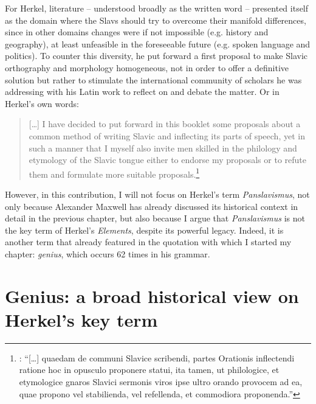 \noindent For Herkel, literature – understood broadly as the written word – presented itself as the domain where the Slavs should try to overcome their manifold differences, since in other domains changes were if not impossible (e.g. history and geography), at least unfeasible in the foreseeable future (e.g. spoken language and politics). To counter this diversity, he put forward a first proposal to make Slavic orthography and morphology homogeneous, not in order to offer a definitive solution but rather to stimulate the international community of scholars he was addressing with his Latin work to reflect on and debate the matter. Or in Herkel’s own words:

\begin{quote}
    […] I have decided to put forward in this booklet some proposals about a common method of writing Slavic and inflecting its parts of speech, yet in such a manner that I myself also invite men skilled in the philology and etymology of the Slavic tongue either to endorse my proposals or to refute them and formulate more suitable proposals.\footnote{\citet[3]{herkel_elementa_1826}: “[…] quaedam de communi Slavice scribendi, partes Orationis inflectendi ratione hoc in opusculo proponere statui, ita tamen, ut philologice, et etymologice gnaros Slavici sermonis viros ipse ultro orando provocem ad ea, quae propono vel stabilienda, vel refellenda, et commodiora proponenda.”}
\end{quote}

\noindent However, in this contribution, I will not focus on Herkel’s term \textit{Pansla\-vismus}, not only because Alexander Maxwell has already discussed its historical context in detail in the previous chapter, but also because I argue that \textit{Panslavismus} is not the key term of Herkel’s \textit{Elements}, despite its powerful legacy. Indeed, it is another term that already featured in the quotation with which I started my chapter: \textit{genius}, which occurs 62 times in his grammar.

\section{Genius: a broad historical view on Herkel’s key term}
\label{sec:Section 2.2}

